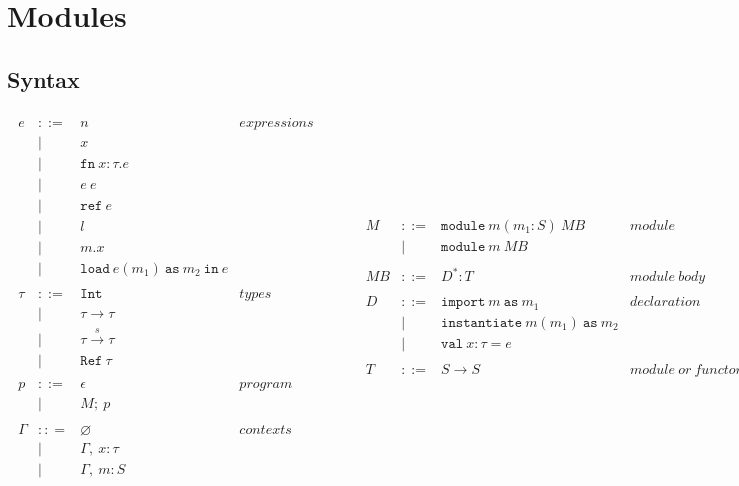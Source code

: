 \documentclass{llncs}
\newcommand{\keyw}[1]{\mathtt{#1}~}
\newcommand{\reftt}{\mathtt{ref}~}
\newcommand{\Reftt}{\mathtt{Ref}~}
\newcommand{\Inttt}{\mathtt{Int}~}
\begin{document}
\section{Modules}

\subsection{Syntax}

\[
\begin{array}{lll}
\begin{array}{lllr}
e & ::= & n & expressions \\
& | & x\\
& | & \keyw{fn} x : \tau . e \\
& | & e~e\\
& | & \reftt e \\
& | & l \\
& | & m.x \\
& | & \keyw{load} e(m_1)~\keyw{as} m_2~\keyw{in} e \\
&&\\
\tau & ::= & \Inttt & types \\
& | & \tau \rightarrow \tau \\
& | & \tau \xrightarrow{s} \tau \\
& | & \Reftt \tau \\
&&\\
p & ::= & \epsilon & program\\
& | & M;~p\\
&&\\
\Gamma & :: = & \varnothing & contexts\\
& | & \Gamma,~x : \tau\\
& | & \Gamma,~m : S\\
\end{array}
& ~~~~~~
&
\begin{array}{lllr}
M & ::= & \keyw{module} m (m_1 : S)~MB & module \\
& | & \keyw{module} m~MB \\
&&\\
MB & ::= & D^* : T & module~body\\
&&\\
D & ::= & \keyw{import} m~\keyw{as} m_1 & declaration \\
& | & \keyw{instantiate} m(m_1)~\keyw{as} m_2 \\
& | & \keyw{val} x : \tau = e \\
&&\\
T & ::= & S \rightarrow S & module~or~functor~type\\

\end{array}
\end{array}\]
\end{document}

